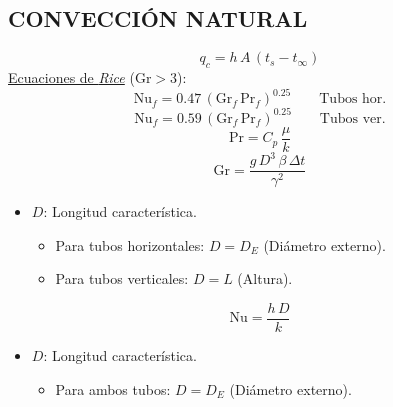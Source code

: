 \documentclass[letter,oneside,10pt]{article}
\begin{document}
\begin{multicols}{3}
\section*{CONVECCIÓN NATURAL}
\vspace{-0.3cm}
\begin{equation*}
    q_c = h\,A\,(t_s-t_\infty)
\end{equation*}
\vspace{-0.3cm}
\underline{Ecuaciones de \emph{Rice}} ($\text{Gr} > 3$):
\begin{equation*}
    \text{Nu}_f = 0.47\,(\text{Gr}_f\,\text{Pr}_f)^{0.25}
    \qquad\text{Tubos hor.}
\end{equation*}
\vspace{-0.3cm}
\begin{equation*}
    \text{Nu}_f = 0.59\,(\text{Gr}_f\,\text{Pr}_f)^{0.25}
    \qquad\text{Tubos ver.}
\end{equation*}
\vspace{-0.1cm}
\begin{equation*}
    \text{Pr} = C_p\,\frac{\mu}{k}
\end{equation*}
\vspace{-0.3cm}
\begin{equation*}
    \text{Gr} = \frac{g\,D^3\,\beta\,\Delta t}{\gamma^2}
\end{equation*}
\vspace{-0.3cm}
\tiny
\begin{itemize}
    \item $D$: Longitud característica.
        \begin{itemize}
            \item Para tubos horizontales: $D=D_E$ (Diámetro externo).
            \item Para tubos verticales: $D=L$ (Altura).
        \end{itemize}
\end{itemize}
\scriptsize
\vspace{-0.1cm}
\begin{equation*}
    \text{Nu} = \frac{h\,D}{k}
\end{equation*}
\vspace{-0.3cm}
\tiny
\begin{itemize}
    \item $D$: Longitud característica.
        \begin{itemize}
            \item Para ambos tubos: $D=D_E$ (Diámetro externo).
        \end{itemize}

\end{itemize}
\end{multicols}
\end{document}
